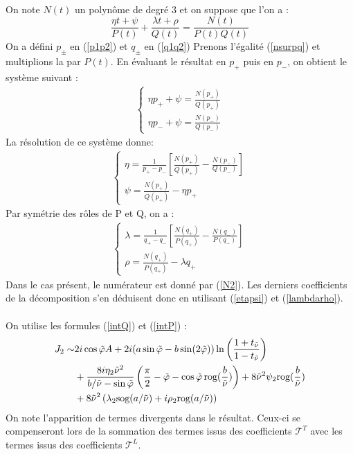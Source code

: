 \paragraph{}
On note $N(t)$ un polynôme de degré 3 et on suppose que l'on a :
\begin{equation}
\frac{\eta t+\psi}{P(t)}+\frac{\lambda t+\rho}{Q(t)}=\frac{N(t)}{P(t)Q(t)}
\label{nsurpq}
\end{equation}
On a défini $p_\pm$ en (\ref{p1p2}) et $q_\pm$ en (\ref{q1q2})
Prenons l'égalité (\ref{nsurpq}) et multiplions la par $P(t)$. En évaluant le résultat en $p_+$ puis en $p_-$, on obtient le système suivant :
\begin{eqnarray*}
\left\{
\begin{array}{l}
\eta p_+ +\psi=\frac{N(p_+)}{Q(p_+)}\\
\eta p_- +\psi=\frac{N(p_-)}{Q(p_-)}
\end{array}
\right.
\end{eqnarray*}
La résolution de ce système donne:
\begin{eqnarray}
\left\{
\begin{array}{l}
\eta=\frac{1}{p_+-p_-}\left[ \frac{N(p_+)}{Q(p_+)}-\frac{N(p_-)}{Q(p_-)} \right] \\
\psi=\frac{N(p_+)}{Q(p_+)}-\eta p_+
\end{array}
\right.
\label{etapsi}
\end{eqnarray}
Par symétrie des rôles de P et Q, on a :
\begin{eqnarray}
\left\{
\begin{array}{l}
\lambda=\frac{1}{q_+-q_-}\left[ \frac{N(q_+)}{P(q_+)}-\frac{N(q_-)}{P(q_-)} \right] \\
\rho=\frac{N(q_+)}{P(q_+)}-\lambda q_+
\end{array}
\right.
\label{lambdarho}
\end{eqnarray}
Dans le cas présent, le numérateur est donné par (\ref{N2}). Les derniers coefficients de la décomposition s'en déduisent donc en utilisant (\ref{etapsi}) et (\ref{lambdarho}).

\paragraph{}
On utilise les formules (\ref{intQ}) et (\ref{intP}) :
\begin{equation}
\begin{split}
J_2\sim &2i\cos\tilde{\varphi} A+2i(a\sin\tilde{\varphi}-b\sin(2\tilde{\varphi}))\ln\left(\frac{1+t_{\tilde{\nu}}}{1-t_{\tilde{\nu}}} \right) \\
&+\frac{8i\eta_2\tilde{\nu}^2}{b/\tilde{\nu}-\sin\tilde{\varphi}}\left(\frac{\pi}{2}-\tilde{\varphi}-\cos\tilde{\varphi}\,\mbox{rog}(\frac{b}{\tilde{\nu}}) \right)+8\tilde{\nu}^2\psi_2 \mbox{rog}(\frac{b}{\tilde{\nu}} )\\
&+8\tilde{\nu}^2 \left(\lambda_2 \mbox{sog}(a/\tilde{\nu})+i\rho_2 \mbox{rog}(a/\tilde{\nu}) \right)
\end{split}
\label{valJ2}
\end{equation}
On note l'apparition de termes divergents dans le résultat. Ceux-ci se compenseront lors de la sommation des termes issus des coefficients $\mathcal{T}^T$ avec les termes issus des coefficients $\mathcal{T}^L$. 

